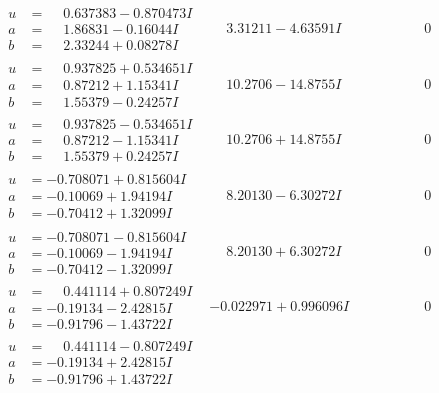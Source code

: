 \documentclass[1p]{elsarticle_modified}
\theoremstyle{definition}
\begin{document}
$$\begin{array}{c|c|c}
\begin{aligned}
u &= \phantom{-}0.637383 - 0.870473 I \\
a &= \phantom{-}1.86831 - 0.16044 I \\
b &= \phantom{-}2.33244 + 0.08278 I\end{aligned}
 & \phantom{-}3.31211 - 4.63591 I & \phantom{-0.000000 } 0 \\ \hline\begin{aligned}
u &= \phantom{-}0.937825 + 0.534651 I \\
a &= \phantom{-}0.87212 + 1.15341 I \\
b &= \phantom{-}1.55379 - 0.24257 I\end{aligned}
 & \phantom{-}10.2706 - 14.8755 I & \phantom{-0.000000 } 0 \\ \hline\begin{aligned}
u &= \phantom{-}0.937825 - 0.534651 I \\
a &= \phantom{-}0.87212 - 1.15341 I \\
b &= \phantom{-}1.55379 + 0.24257 I\end{aligned}
 & \phantom{-}10.2706 + 14.8755 I & \phantom{-0.000000 } 0 \\ \hline\begin{aligned}
u &= -0.708071 + 0.815604 I \\
a &= -0.10069 + 1.94194 I \\
b &= -0.70412 + 1.32099 I\end{aligned}
 & \phantom{-}8.20130 - 6.30272 I & \phantom{-0.000000 } 0 \\ \hline\begin{aligned}
u &= -0.708071 - 0.815604 I \\
a &= -0.10069 - 1.94194 I \\
b &= -0.70412 - 1.32099 I\end{aligned}
 & \phantom{-}8.20130 + 6.30272 I & \phantom{-0.000000 } 0 \\ \hline\begin{aligned}
u &= \phantom{-}0.441114 + 0.807249 I \\
a &= -0.19134 - 2.42815 I \\
b &= -0.91796 - 1.43722 I\end{aligned}
 & -0.022971 + 0.996096 I & \phantom{-0.000000 } 0 \\ \hline\begin{aligned}
u &= \phantom{-}0.441114 - 0.807249 I \\
a &= -0.19134 + 2.42815 I \\
b &= -0.91796 + 1.43722 I\end{aligned}

\end{array}$$
\end{document}
